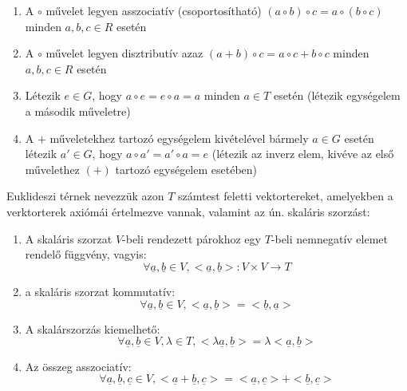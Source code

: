 \documentclass[11pt,a4paper]{article}
\begin{document}
\begin{tcolorbox}[colback=blue!5!white,colframe=blue!70!black,title= 1. Csoport{,} gyűrű{,} test]
\begin{enumerate}
            \item A \(\circ\) művelet legyen asszociatív (csoportosítható) \((a \circ b) \circ c = a \circ (b \circ c)\) minden \(a, b, c \in R\) esetén
            \item A \(\circ\) művelet legyen disztributív azaz \((a + b) \circ c = a \circ c + b \circ c\) minden \(a, b, c \in R\) esetén
            \item Létezik \(e \in G\), hogy \(a \circ e = e \circ a = a\) minden \(a \in T\) esetén (létezik egységelem a második műveletre)
            \item A \(+\) műveletekhez tartozó egységelem kivételével bármely \(a \in G\) esetén létezik \(a' \in G\), hogy \(a \circ a' = a' \circ a = e\) (létezik az inverz elem, kivéve az első művelethez \((+)\) tartozó egységelem
            esetében)
        \end{enumerate}
\end{tcolorbox}
\begin{tcolorbox}[colback=blue!5!white,colframe=blue!70!black,title= 2. Euklideszi tér]
Euklideszi térnek nevezzük azon \(T\) számtest feletti vektortereket, amelyekben a verktorterek axiómái értelmezve vannak, valamint az ún. skaláris szorzást:    
    \begin{enumerate}
        \item A skaláris szorzat \(V\)-beli rendezett párokhoz egy \(T\)-beli nemnegatív elemet rendelő függvény, vagyis:
        $$\forall \underline{a},\underline{b} \in V,<\underline{a},\underline{b}>:V \times V \to T$$
        \item a skaláris szorzat kommutatív:
        $$\forall \underline{a}, \underline{b} \in V, <\underline{a}, \underline{b} > =<\underline{b}, \underline{a} >$$
        \item A skalárszorzás kiemelhető:
        $$\forall \underline {a},\underline{b} \in V, \lambda \in T, <\lambda \underline{a}, \underline{b} > = \lambda <\underline{a}, \underline{b}>$$
        \item Az összeg asszociatív:
        $$\forall \underline{a}, \underline{b}, \underline{c} \in V, <\underline{a} + \underline{b},\underline{c}> = <\underline{a}, \underline{c}> + <\underline{b}, \underline{c}>$$
    \end{enumerate}
\end{tcolorbox}
\end{document}
